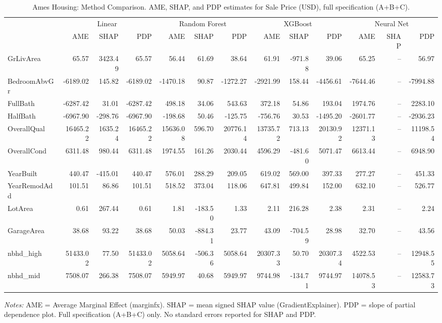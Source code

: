 \begin{table}[htbp]
\centering
\small
\begin{threeparttable}
\caption{Ames Housing: Method Comparison. AME, SHAP, and PDP estimates for Sale Price (USD), full specification (A+B+C).}
\label{tab:ames_housing_method_comparison}
\begin{tabular}{lrrrrrrrrrrrr}
\toprule
 & \multicolumn{3}{c}{Linear} & \multicolumn{3}{c}{Random Forest} & \multicolumn{3}{c}{XGBoost} & \multicolumn{3}{c}{Neural Net} \\
\cmidrule(lr){2-4} \cmidrule(lr){5-7} \cmidrule(lr){8-10} \cmidrule(lr){11-13} 
 & AME & SHAP & PDP & AME & SHAP & PDP & AME & SHAP & PDP & AME & SHAP & PDP \\
\midrule
GrLivArea & 65.57 & 3423.49 & 65.57 & 56.44 & 61.69 & 38.64 & 61.91 & -971.88 & 39.06 & 65.25 & -- & 56.97 \\
BedroomAbvGr & -6189.02 & 145.82 & -6189.02 & -1470.18 & 90.87 & -1272.27 & -2921.99 & 158.44 & -4456.61 & -7644.46 & -- & -7994.88 \\
FullBath & -6287.42 & 31.01 & -6287.42 & 498.18 & 34.06 & 543.63 & 372.18 & 54.86 & 193.04 & 1974.76 & -- & 2283.10 \\
HalfBath & -6967.90 & -298.76 & -6967.90 & -198.68 & 50.46 & -125.75 & -756.76 & 30.53 & -1495.20 & -2601.77 & -- & -2936.23 \\
\midrule
OverallQual & 16465.22 & 1635.24 & 16465.22 & 15636.08 & 596.70 & 20776.14 & 13735.72 & 713.13 & 20130.92 & 12371.13 & -- & 11198.54 \\
OverallCond & 6311.48 & 980.44 & 6311.48 & 1974.55 & 161.26 & 2030.44 & 4596.29 & -481.60 & 5071.47 & 6613.44 & -- & 6948.90 \\
YearBuilt & 440.47 & -415.01 & 440.47 & 576.01 & 288.29 & 209.05 & 619.02 & 569.00 & 397.33 & 277.27 & -- & 451.33 \\
YearRemodAdd & 101.51 & 86.86 & 101.51 & 518.52 & 373.04 & 118.06 & 647.81 & 499.84 & 152.00 & 632.10 & -- & 526.77 \\
\midrule
LotArea & 0.61 & 267.44 & 0.61 & 1.81 & -183.50 & 1.33 & 2.11 & 216.28 & 2.38 & 2.31 & -- & 2.24 \\
GarageArea & 38.68 & 93.22 & 38.68 & 50.03 & -884.31 & 23.77 & 43.09 & -704.59 & 28.98 & 32.70 & -- & 43.56 \\
nbhd\_high & 51433.02 & 77.50 & 51433.02 & 5058.64 & -506.36 & 5058.64 & 20307.33 & 50.70 & 20307.34 & 4522.53 & -- & 12948.55 \\
nbhd\_mid & 7508.07 & 266.38 & 7508.07 & 5949.97 & 40.68 & 5949.97 & 9744.98 & -134.71 & 9744.97 & 14078.53 & -- & 12583.73 \\
\bottomrule
\end{tabular}
\begin{tablenotes}
\footnotesize
\item \textit{Notes:} AME = Average Marginal Effect (marginfx). SHAP = mean signed SHAP value (GradientExplainer). PDP = slope of partial dependence plot. Full specification (A+B+C) only. No standard errors reported for SHAP and PDP.
\end{tablenotes}
\end{threeparttable}
\end{table}